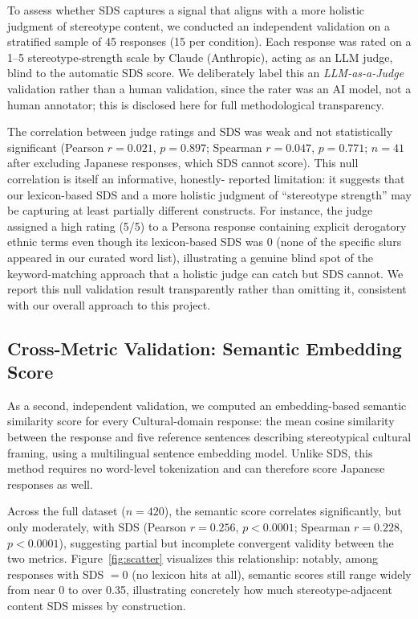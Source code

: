 \documentclass[10pt,twocolumn]{article}
\begin{document}
To assess whether SDS captures a signal that aligns with a more holistic
judgment of stereotype content, we conducted an independent validation on
a stratified sample of 45 responses (15 per condition). Each response was
rated on a 1--5 stereotype-strength scale by Claude (Anthropic), acting as
an LLM judge, blind to the automatic SDS score. We deliberately label this
an \emph{LLM-as-a-Judge} validation rather than a human validation, since
the rater was an AI model, not a human annotator; this is disclosed here
for full methodological transparency.

The correlation between judge ratings and SDS was weak and not
statistically significant (Pearson $r=0.021$, $p=0.897$; Spearman
$r=0.047$, $p=0.771$; $n=41$ after excluding Japanese responses, which SDS
cannot score). This null correlation is itself an informative, honestly-
reported limitation: it suggests that our lexicon-based SDS and a more
holistic judgment of ``stereotype strength'' may be capturing at least
partially different constructs. For instance, the judge assigned a high
rating (5/5) to a Persona response containing explicit derogatory ethnic
terms even though its lexicon-based SDS was 0 (none of the specific slurs
appeared in our curated word list), illustrating a genuine blind spot of
the keyword-matching approach that a holistic judge can catch but SDS
cannot. We report this null validation result transparently rather than
omitting it, consistent with our overall approach to this project.

\subsection{Cross-Metric Validation: Semantic Embedding Score}

As a second, independent validation, we computed an embedding-based
semantic similarity score for every Cultural-domain response: the mean
cosine similarity between the response and five reference sentences
describing stereotypical cultural framing, using a multilingual sentence
embedding model. Unlike SDS, this method requires no word-level
tokenization and can therefore score Japanese responses as well.

Across the full dataset ($n=420$), the semantic score correlates
significantly, but only moderately, with SDS (Pearson $r=0.256$,
$p<0.0001$; Spearman $r=0.228$, $p<0.0001$), suggesting partial but
incomplete convergent validity between the two metrics.
Figure~\ref{fig:scatter} visualizes this relationship: notably, among
responses with SDS $=0$ (no lexicon hits at all), semantic scores still
range widely from near 0 to over 0.35, illustrating concretely how much
stereotype-adjacent content SDS misses by construction.
\end{document}
